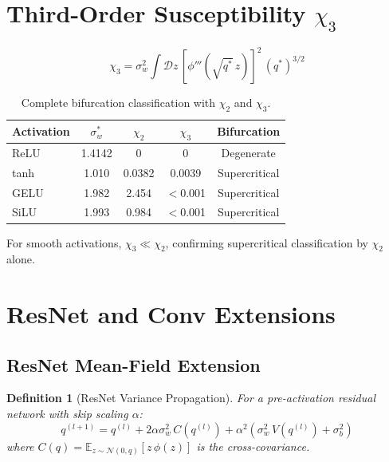 \documentclass[10pt]{article}
\newcommand{\EE}{\mathbb{E}}
\newtheorem{definition}[theorem]{Definition}
\begin{document}
\section{Third-Order Susceptibility $\chi_3$}
\label{app:chi3}

\begin{equation}
    \chi_3 = \sigma_w^2 \int \mathcal{D}z\, [\phi'''(\sqrt{q^*}\, z)]^2\, (q^*)^{3/2}
\end{equation}

\begin{table}[h]
\centering
\caption{Complete bifurcation classification with $\chi_2$ and $\chi_3$.}
\label{tab:chi3}
\small
\begin{tabular}{@{}lcccc@{}}
\toprule
\textbf{Activation} & $\sigma_w^*$ & $\chi_2$ & $\chi_3$ & \textbf{Bifurcation} \\
\midrule
ReLU  & 1.4142 & 0        & 0       & Degenerate \\
tanh  & 1.010  & 0.0382   & 0.0039  & Supercritical \\
GELU  & 1.982  & 2.454    & $<$0.001 & Supercritical \\
SiLU  & 1.993  & 0.984    & $<$0.001 & Supercritical \\
\bottomrule
\end{tabular}
\end{table}

For smooth activations, $\chi_3 \ll \chi_2$, confirming supercritical classification by $\chi_2$ alone.

\section{ResNet and Conv Extensions}
\label{app:resnet}

\subsection{ResNet Mean-Field Extension}

\begin{definition}[ResNet Variance Propagation]
For a pre-activation residual network with skip scaling $\alpha$:
\begin{equation}
    q^{(l+1)} = q^{(l)} + 2\alpha\sigma_w^2\, C(q^{(l)}) + \alpha^2(\sigma_w^2\, V(q^{(l)}) + \sigma_b^2)
    \label{eq:resnet-variance}
\end{equation}
where $C(q) = \EE_{z\sim\mathcal{N}(0,q)}[z\,\phi(z)]$ is the cross-covariance.
\end{definition}
\end{document}
